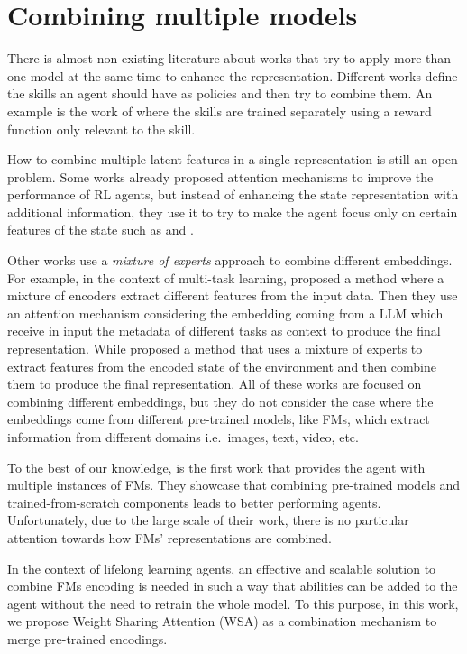 

\section{Combining multiple models}\label{sec:fm_rl_combination}
There is almost non-existing literature about works that try to apply more than one model at the same time to enhance the representation.
Different works define the skills an agent should have as policies and then try to combine them.
An example is the work of \citet{sahni2017learning} where the skills are trained separately using a reward function only relevant to the skill.

How to combine multiple latent features in a single representation is still an open problem.
Some works already proposed attention mechanisms to improve the performance of RL agents, but instead of enhancing the state representation with additional information, they use it to try to make the agent focus only on certain features of the state such as \citet{bramlage2022generalized} and \citet{blakeman2022selective}.

Other works use a \textit{mixture of experts} approach to combine different embeddings.
For example, in the context of multi-task learning, \citet{sodhani2021multi} proposed a method where a mixture of encoders extract different features from the input data.
Then they use an attention mechanism considering the embedding coming from a LLM which receive in input the metadata of different tasks as context to produce the final representation.
While \citet{obando2024mixtures} proposed a method that uses a mixture of experts to extract features from the encoded state of the environment and then combine them to produce the final representation.
All of these works are focused on combining different embeddings, but they do not consider the case where the embeddings come from different pre-trained models, like FMs, which extract information from different domains i.e.\ images, text, video, etc.

To the best of our knowledge, \citet{sima2024} is the first work that provides the agent with multiple instances of FMs.
They showcase that combining pre-trained models and trained-from-scratch components leads to better performing agents.
Unfortunately, due to the large scale of their work, there is no particular attention towards how FMs' representations are combined.

In the context of lifelong learning agents, an effective and scalable solution to combine FMs encoding is needed in such a way that abilities can be added to the agent without the need to retrain the whole model.
To this purpose, in this work, we propose Weight Sharing Attention (WSA) as a combination mechanism to merge pre-trained encodings.
